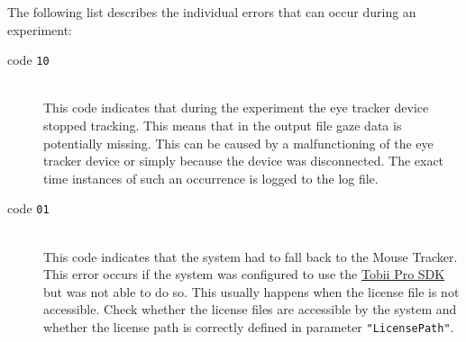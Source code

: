 \documentclass[a4paper,oneside]{book}
\begin{document}
The following list describes the individual errors that can occur during an experiment:
\begin{description}
    \item[code \texttt{10}] \hfill \\
        This code indicates that during the experiment the eye tracker device stopped tracking.
        This means that in the output file gaze data is potentially missing.
        This can be caused by a malfunctioning of the eye tracker device or simply because the device was disconnected.
        The exact time instances of such an occurrence is logged to the log file.
    \item[code \texttt{01}] \hfill \\
        This code indicates that the system had to fall back to the Mouse Tracker.
        This error occurs if the system was configured to use the \href{http://developer.tobii.com/tobii-pro-sdk/}{Tobii Pro SDK} but was not able to do so.
        This usually happens when the license file is not accessible.
        Check whether the license files are accessible by the system and whether the license path is correctly defined in parameter \texttt{"LicensePath"}.
\end{description}

\end{document}
